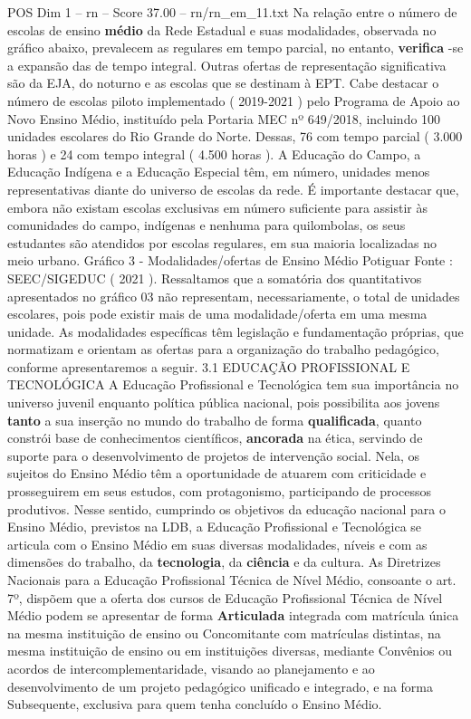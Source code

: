\begin{textsample}{POS Dim 1 – rn – Score 37.00 – rn/rn\_em\_11.txt}
Na relação entre o número de escolas de ensino \textbf{médio} da Rede Estadual e suas modalidades, observada no gráfico abaixo, prevalecem as regulares em tempo parcial, no entanto, \textbf{verifica} -se a expansão das de tempo integral.
Outras ofertas de representação significativa são da EJA, do noturno e as escolas que se destinam à EPT.
Cabe destacar o número de escolas piloto implementado ( 2019-2021 ) pelo Programa de Apoio ao Novo Ensino Médio, instituído pela Portaria MEC nº 649/2018, incluindo 100 unidades escolares do Rio Grande do Norte.
Dessas, 76 com tempo parcial ( 3.000 horas ) e 24 com tempo integral ( 4.500 horas ).
A Educação do Campo, a Educação Indígena e a Educação Especial têm, em número, unidades menos representativas diante do universo de escolas da rede.
É importante destacar que, embora não existam escolas exclusivas em número suficiente para assistir às comunidades do campo, indígenas e nenhuma para quilombolas, os seus estudantes são atendidos por escolas regulares, em sua maioria localizadas no meio urbano.
Gráfico 3 - Modalidades/ofertas de Ensino Médio Potiguar Fonte : SEEC/SIGEDUC ( 2021 ).
Ressaltamos que a somatória dos quantitativos apresentados no gráfico 03 não representam, necessariamente, o total de unidades escolares, pois pode existir mais de uma modalidade/oferta em uma mesma unidade.
As modalidades específicas têm legislação e fundamentação próprias, que normatizam e orientam as ofertas para a organização do trabalho pedagógico, conforme apresentaremos a seguir. 3.1 EDUCAÇÃO PROFISSIONAL E TECNOLÓGICA A Educação Profissional e Tecnológica tem sua importância no universo juvenil enquanto política pública nacional, pois possibilita aos jovens \textbf{tanto} a sua inserção no mundo do trabalho de forma \textbf{qualificada}, quanto constrói base de conhecimentos científicos, \textbf{ancorada} na ética, servindo de suporte para o desenvolvimento de projetos de intervenção social.
Nela, os sujeitos do Ensino Médio têm a oportunidade de atuarem com criticidade e prosseguirem em seus estudos, com protagonismo, participando de processos produtivos.
Nesse sentido, cumprindo os objetivos da educação nacional para o Ensino Médio, previstos na LDB, a Educação Profissional e Tecnológica se articula com o Ensino Médio em suas diversas modalidades, níveis e com as dimensões do trabalho, da \textbf{tecnologia}, da \textbf{ciência} e da cultura.
As Diretrizes Nacionais para a Educação Profissional Técnica de Nível Médio, consoante o art. 7º, dispõem que a oferta dos cursos de Educação Profissional Técnica de Nível Médio podem se apresentar de forma \textbf{Articulada} integrada com matrícula única na mesma instituição de ensino ou Concomitante com matrículas distintas, na mesma instituição de ensino ou em instituições diversas, mediante Convênios ou acordos de intercomplementaridade, visando ao planejamento e ao desenvolvimento de um projeto pedagógico unificado e integrado, e na forma Subsequente, exclusiva para quem tenha concluído o Ensino Médio.

\end{textsample}
